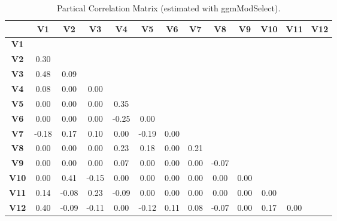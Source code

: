 \begin{table}[H]
\centering
\begin{tabular}{ccccccccccccc}
\hline
             & \textbf{V1} & \textbf{V2} & \textbf{V3} & \textbf{V4} & \textbf{V5} & \textbf{V6} & \textbf{V7} & \textbf{V8} & \textbf{V9} & \textbf{V10} & \textbf{V11} & \textbf{V12} \\ \hline
\textbf{V1}  &             &             &             &             &             &             &             &             &             &              &              &              \\
\textbf{V2}  & 0.30        &             &             &             &             &             &             &             &             &              &              &              \\
\textbf{V3}  & 0.48        & 0.09        &             &             &             &             &             &             &             &              &              &              \\
\textbf{V4}  & 0.08        & 0.00        & 0.00        &             &             &             &             &             &             &              &              &              \\
\textbf{V5}  & 0.00        & 0.00        & 0.00        & 0.35        &             &             &             &             &             &              &              &              \\
\textbf{V6}  & 0.00        & 0.00        & 0.00        & -0.25       & 0.00        &             &             &             &             &              &              &              \\
\textbf{V7}  & -0.18       & 0.17        & 0.10        & 0.00        & -0.19       & 0.00        &             &             &             &              &              &              \\
\textbf{V8}  & 0.00        & 0.00        & 0.00        & 0.23        & 0.18        & 0.00        & 0.21        &             &             &              &              &              \\
\textbf{V9}  & 0.00        & 0.00        & 0.00        & 0.07        & 0.00        & 0.00        & 0.00        & -0.07       &             &              &              &              \\
\textbf{V10} & 0.00        & 0.41        & -0.15       & 0.00        & 0.00        & 0.00        & 0.00        & 0.00        & 0.00        &              &              &              \\
\textbf{V11} & 0.14        & -0.08       & 0.23        & -0.09       & 0.00        & 0.00        & 0.00        & 0.00        & 0.00        & 0.00         &              &              \\
\textbf{V12} & 0.40        & -0.09       & -0.11       & 0.00        & -0.12       & 0.11        & 0.08        & -0.07       & 0.00        & 0.17         & 0.00         &              \\ \hline
\end{tabular}
\caption[]{Partical Correlation Matrix (estimated with ggmModSelect).}
\label{tab:parcorrm}
\end{table}


